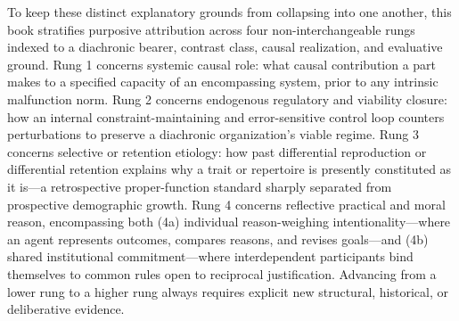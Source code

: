 \documentclass[
  english,
  11pt,
  oneside]{book}
\begin{document}
To keep these distinct explanatory grounds from collapsing into one another, this book stratifies purposive attribution across four non-interchangeable rungs indexed to a diachronic bearer, contrast class, causal realization, and evaluative ground. Rung 1 concerns systemic causal role: what causal contribution a part makes to a specified capacity of an encompassing system, prior to any intrinsic malfunction norm. Rung 2 concerns endogenous regulatory and viability closure: how an internal constraint-maintaining and error-sensitive control loop counters perturbations to preserve a diachronic organization's viable regime. Rung 3 concerns selective or retention etiology: how past differential reproduction or differential retention explains why a trait or repertoire is presently constituted as it is---a retrospective proper-function standard sharply separated from prospective demographic growth. Rung 4 concerns reflective practical and moral reason, encompassing both (4a) individual reason-weighing intentionality---where an agent represents outcomes, compares reasons, and revises goals---and (4b) shared institutional commitment---where interdependent participants bind themselves to common rules open to reciprocal justification. Advancing from a lower rung to a higher rung always requires explicit new structural, historical, or deliberative evidence.
\end{document}
